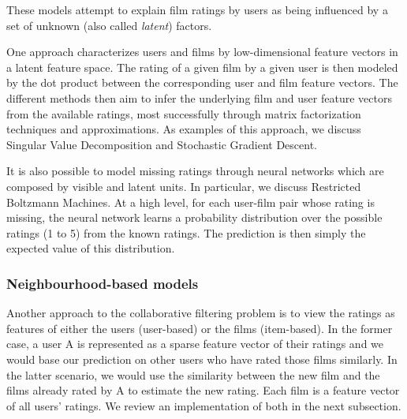 \documentclass[10pt,conference,compsocconf]{IEEEtran}
\begin{document}
%
%

These models attempt to explain film ratings by users as being influenced by a set of unknown (also called \emph{latent}) factors.

One approach characterizes users and films by low-dimensional feature vectors in a latent feature space. The rating of a given film by a given user is then modeled by the dot product between the corresponding user and film feature vectors. The different methods then aim to infer the underlying film and user feature vectors from the available ratings, most successfully through matrix factorization techniques and approximations. As examples of this approach, we discuss Singular Value Decomposition and Stochastic Gradient Descent.

It is also possible to model missing ratings through neural networks which are composed by visible and latent units. In particular, we discuss Restricted Boltzmann Machines. At a high level, for each user-film pair whose rating is missing, the neural network learns a probability distribution over the possible ratings (1 to 5) from the known ratings. The prediction is then simply the expected value of this distribution.


\subsubsection*{\textbf{Neighbourhood-based models}} Another approach to the collaborative filtering problem is to view the ratings as features of either the users (user-based) or the films (item-based). In the former case, a user A is represented as a sparse feature vector of their ratings and we would base our prediction on other users who have rated those films similarly. In the latter scenario, we would use the similarity between the new film and the films already rated by A to estimate the new rating. Each film is a feature vector of all users' ratings. We review an implementation of both in the next subsection.
\end{document}
